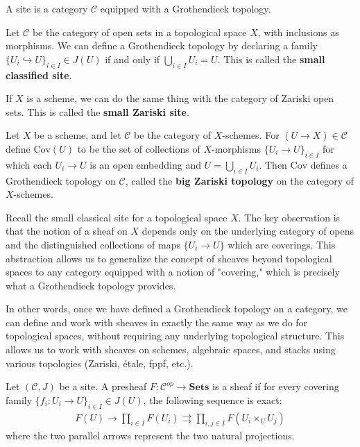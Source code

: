 \documentclass[12pt]{article}
\begin{document}
\begin{definition}[Site]
    A site is a category $\mathcal{C}$ equipped with a Grothendieck topology.
\end{definition}
\begin{example}
    Let $\mathcal{C}$ be the category of open sets in a topological space $X$, with inclusions as morphisms. We can define a Grothendieck topology by declaring a family $\{U_i \hookrightarrow U\}_{i \in I} \in J(U)$ if and only if $\bigcup_{i \in I} U_i = U$. This is called the \textbf{small classified site}.

    If $X$ is a scheme, we can do the same thing with the category of Zariski open sets. This is called the \textbf{small Zariski site}.
\end{example}

\begin{example}
    Let $X$ be a scheme, and let $\mathcal{C}$ be the category of $X$-schemes. For $(U \to X) \in \mathcal{C}$ define $\text{Cov}(U)$ to be the set of collections of $X$-morphisms $\{U_i \to U\}_{i \in I}$ for which each $U_i \to U$ is an open embedding and $U = \bigcup_{i \in I} U_i$. Then $\text{Cov}$ defines a Grothendieck topology on $\mathcal{C}$, called the \textbf{big Zariski topology} on the category of $X$-schemes.
\end{example}
\begin{remark}
    Recall the small classical site for a topological space $X$. The key observation is that the notion of a sheaf on $X$ depends only on the underlying category of opens and the distinguished collections of maps $\{U_i \to U\}$ which are coverings. This abstraction allows us to generalize the concept of sheaves beyond topological spaces to any category equipped with a notion of "covering," which is precisely what a Grothendieck topology provides.

    In other words, once we have defined a Grothendieck topology on a category, we can define and work with sheaves in exactly the same way as we do for topological spaces, without requiring any underlying topological structure. This allows us to work with sheaves on schemes, algebraic spaces, and stacks using various topologies (Zariski, étale, fppf, etc.).
\end{remark}
\begin{definition}
    Let $(\mathcal{C}, J)$ be a site. A presheaf $F: \mathcal{C}^{op} \to \mathbf{Sets}$ is a sheaf if for every covering family $\{f_i: U_i \to U\}_{i \in I} \in J(U)$, the following sequence is exact:
    \begin{align*}
        F(U) \to \prod_{i \in I} F(U_i) \rightrightarrows \prod_{i,j \in I} F(U_i \times_U U_j)
    \end{align*}
    where the two parallel arrows represent the two natural projections.
\end{definition}
\end{document}
